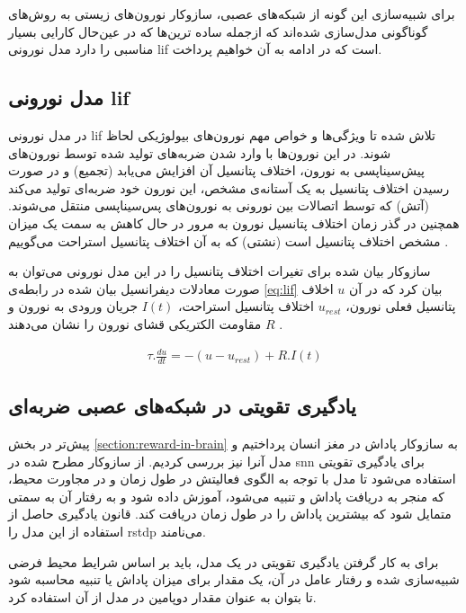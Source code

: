 \documentclass[12pt]{report}
\begin{document}
	برای شبیه‌سازی این گونه از شبکه‌های عصبی، سازوکار نورون‌های زیستی به روش‌‌های گوناگونی مدل‌سازی شده‌اند که ازجمله ساده ترین‌ها که در عین‌حال کارایی بسیار مناسبی را دارد مدل نورونی \gls{lif} است که در ادامه به آن خواهیم پرداخت.
	
	
	\subsection{مدل نورونی \gls{lif}}
	در مدل نورونی \gls{lif} تلاش شده تا ویژگی‌ها و خواص مهم نورون‌های بیولوژیکی لحاظ شوند. در این نورون‌ها با وارد شدن ضربه‌های تولید شده توسط نورون‌های پیش‌سیناپسی به نورون، اختلاف پتانسیل آن افزایش می‌یابد (تجمیع) و در صورت رسیدن اختلاف پتانسیل به یک آستانه‌ی مشخص، این نورون خود ضربه‌ای تولید می‌کند (آتش) که توسط اتصالات بین نورونی به نورون‌های پس‌سیناپسی منتقل می‌شوند. همچنین در گذر زمان اختلاف پتانسیل نورون به مرور در حال کاهش به سمت یک میزان مشخص اختلاف پتانسیل است (نشتی) که به آن اختلاف پتانسیل استراحت می‌گوییم
	\cite{gerstner2014neuronal}.
	
	ساز‌وکار بیان شده برای تغیرات اختلاف پتانسیل را در این مدل نورونی می‌توان به صورت معادلات دیفرانسیل بیان شده در رابطه‌ی \ref{eq:lif} بیان کرد که در آن $u$ اخلاف پتانسیل فعلی نورون، $u_{rest}$ اختلاف پتانسیل استراحت، $I(t)$ جریان ورودی به نورون و $R$ مقاومت الکتریکی قشای نورون را نشان می‌دهند
	\cite{gerstner2014neuronal}.
	
	\begin{align}
		\tau . \frac{du}{dt} = -(u - u_{rest}) + R . I(t) 
		\label{eq:lif}
	\end{align}

	\subsection{یادگیری تقویتی در شبکه‌های عصبی ضربه‌ای}
	
	پیش‌تر در بخش \ref{section:reward-in-brain} به سازوکار پاداش در مغز انسان پرداختیم و مدل آنرا نیز بررسی کردیم. از سازوکار مطرح شده در \gls{snn} برای یادگیری تقویتی استفاده می‌شود تا مدل با توجه به الگوی فعالیتش در طول زمان و در مجاورت محیط، که منجر به دریافت پاداش و تنبیه می‌شود، آموزش داده شود و به رفتار آن به سمتی متمایل شود که بیشترین پاداش را در طول زمان دریافت کند. قانون یادگیری حاصل از استفاده از این مدل را \gls{rstdp} می‌نامند.
	
	برای به کار گرفتن یادگیری تقویتی در یک مدل، باید بر اساس شرایط محیط فرضی شبیه‌سازی شده و رفتار عامل در آن، یک مقدار برای میزان پاداش یا تنبیه محاسبه شود تا بتوان به عنوان مقدار دوپامین در مدل از آن استفاده کرد.
 	
\end{document}
